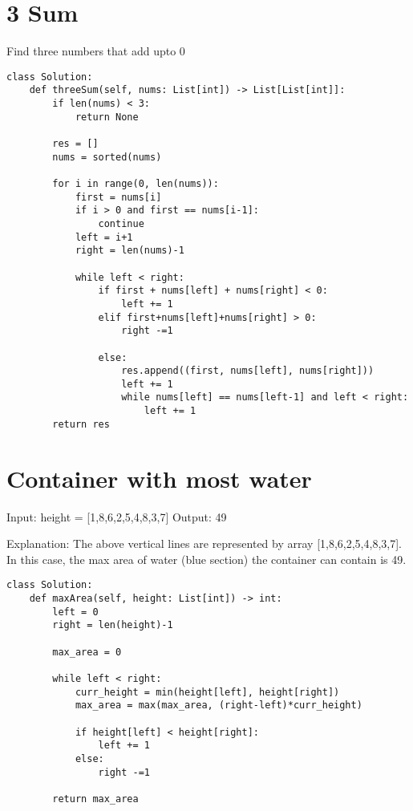 \documentclass[24pt, a4]{article}
\begin{document}
\section{3 Sum}
Find three numbers that add upto 0
\begin{lstlisting}
class Solution:
    def threeSum(self, nums: List[int]) -> List[List[int]]:
        if len(nums) < 3:
            return None
        
        res = []
        nums = sorted(nums)
        
        for i in range(0, len(nums)):
            first = nums[i]
            if i > 0 and first == nums[i-1]:
                continue
            left = i+1
            right = len(nums)-1
            
            while left < right:
                if first + nums[left] + nums[right] < 0:
                    left += 1
                elif first+nums[left]+nums[right] > 0:
                    right -=1
                
                else:
                    res.append((first, nums[left], nums[right]))
                    left += 1
                    while nums[left] == nums[left-1] and left < right:
                        left += 1
        return res
\end{lstlisting}
\section{Container with most water}
Input: height = [1,8,6,2,5,4,8,3,7]
Output: 49

Explanation: The above vertical lines are represented by array [1,8,6,2,5,4,8,3,7]. In this case, the max area of water (blue section) the container can contain is 49.
\begin{lstlisting}
class Solution:
    def maxArea(self, height: List[int]) -> int:
        left = 0 
        right = len(height)-1
        
        max_area = 0
        
        while left < right:
            curr_height = min(height[left], height[right])
            max_area = max(max_area, (right-left)*curr_height)
            
            if height[left] < height[right]:
                left += 1
            else:
                right -=1
        
        return max_area
\end{lstlisting}
\end{document}
